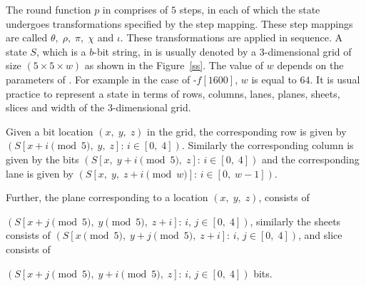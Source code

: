 The round function $p$ in \Keccak{} comprises of $5$ steps, in each of which the state undergoes transformations specified by the step mapping. These step mappings are called $\theta,\;\rho,\; \pi,\; \chi$ and  $\iota$. These transformations are applied in sequence. A state $S$, which is a $b$-bit string, in \Keccak{} is usually denoted by a $3$-dimensional grid of size $(5 \times 5 \times w)$ as shown in the Figure~\ref{ss}. The value of $w$ depends on the parameters of \Keccak{}. For example in the case of \Keccak-$f\left[1600\right]$, $w$ is equal to $64$. It is usual practice to represent a state in terms of rows, columns, lanes, planes, sheets, slices and width of the $3$-dimensional grid.

Given a bit location $(x,\;y,\;z)$ in the grid, the corresponding row is given by $\left( S[x+i \pmod 5,\;y,\;z] : \, i \in [0,\;4] \right)$. Similarly the corresponding column is given by the bits $\left( S[x,\;y+i \pmod 5,\;z] : \, i \in [0,\;4] \right)$ and the corresponding lane is given by $\left( S[x,\;y,\;z+i \pmod w] : \, i \in [0,\;w-1] \right)$. 

Further, the plane corresponding to a location $(x,\;y,\;z)$, consists of 

$\left( S[x+j \pmod 5,\;y \pmod 5,\;z + i] : \, i,\,j \in [0,\;4] \right)$, similarly the sheets consists of $\left( S[x \pmod 5,\;y+j \pmod 5,\;z + i] : \, i,\,j \in [0,\;4] \right)$, and slice consists of 

$\left( S[x+j \pmod 5,\;y+i \pmod 5,\;z] : \, i,\,j \in [0,\;4] \right)$ bits.

